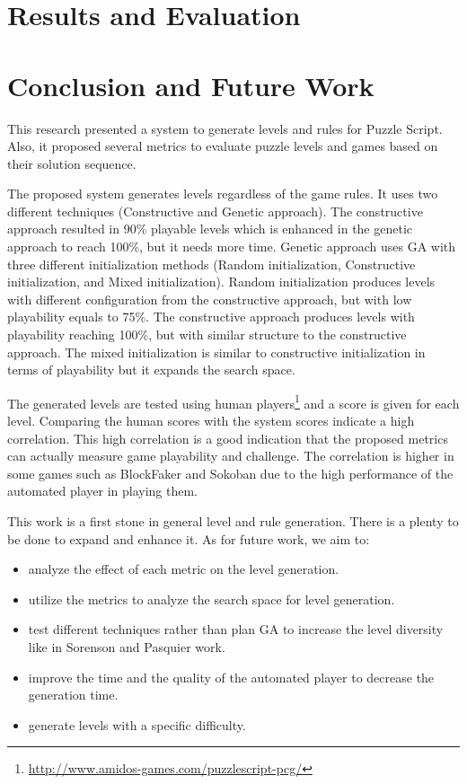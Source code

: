 \documentclass[letterpaper]{article}
\begin{document}
\section{Results and Evaluation}

\section{Conclusion and Future Work}
This research presented a system to generate levels and rules for Puzzle Script. Also, it proposed several metrics to evaluate puzzle levels and games based on their solution sequence.\\\par

The proposed system generates levels regardless of the game rules. It uses two different techniques (Constructive and Genetic approach). The constructive approach resulted in 90\% playable levels which is enhanced in the genetic approach to reach 100\%, but it needs more time. Genetic approach uses GA with three different initialization methods (Random initialization, Constructive initialization, and Mixed initialization). Random initialization produces levels with different configuration from the constructive approach, but with low playability equals to 75\%.  The constructive approach produces levels with playability reaching 100\%, but with similar structure to the constructive approach. The mixed initialization is similar to constructive initialization in terms of playability but it expands the search space.\\\par

The generated levels are tested using human players\footnote{\url{http://www.amidos-games.com/puzzlescript-pcg/}} and a score is given for each level. Comparing the human scores with the system scores indicate a high correlation. This high correlation is a good indication that the proposed metrics can actually measure game playability and challenge. The correlation is higher in some games such as BlockFaker and Sokoban due to the high performance of the automated player in playing them.\\\par

This work is a first stone in general level and rule generation. There is a plenty to be done to expand and enhance it. As for future work, we aim to:
\begin{itemize}
	\item analyze the effect of each metric on the level generation.
	\item utilize the metrics to analyze the search space for level generation.
	\item test different techniques rather than plan GA to increase the level diversity like in Sorenson and Pasquier work\cite{genericLevelFramework}.
	\item improve the time and the quality of the automated player to decrease the generation time.
	\item generate levels with a specific difficulty.
\end{itemize}
\end{document}
